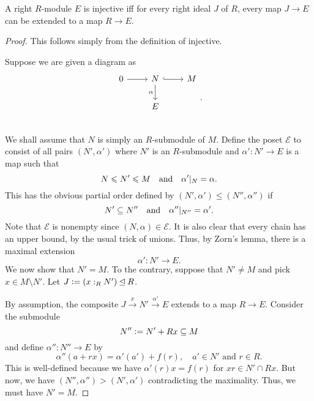 \begin{thm} \label{thm:baers-criterion}
	A right $R$-module $E$ is injective iff for every right ideal $J$ of $R$, every map $J \to E$ can be extended to a map $R \to E$.
\end{thm}
\begin{proof} 
	\forward This follows simply from the definition of injective.

	\backward Suppose we are given a diagram as
	\begin{equation*} 
		\begin{tikzcd}
			0 \arrow[r] & N \arrow[d, "\alpha"'] \arrow[r, hook] & M \\
			  & E & \\
		\end{tikzcd}.
	\end{equation*}
	We shall assume that $N$ is simply an $R$-submodule of $M$. Define the poset $\mathcal{E}$ to consist of all pairs $(N', \alpha')$ where $N'$ is an $R$-submodule and $\alpha' : N' \to E$ is a map such that
	\begin{equation*} 
		N \le N' \le M \andd \alpha'|_{N} = \alpha.
	\end{equation*}
	This has the obvious partial order defined by $(N', \alpha') \le (N'', \alpha'')$ if
	\begin{equation*} 
		N' \subset N'' \andd \alpha''|_{N''} = \alpha'.
	\end{equation*}
	Note that $\mathcal{E}$ is nonempty since $(N, \alpha) \in \mathcal{E}$. It is also clear that every chain has an upper bound, by the usual trick of unions. Thus, by Zorn's lemma, there is a maximal extension
	\begin{equation*} 
		\alpha' : N' \to E.
	\end{equation*}
	We now show that $N' = M$. To the contrary, suppose that $N' \neq M$ and pick $x \in M \setminus N'$. Let $J \vcentcolon= (x :_{R} N') \unlhd R$. 

	By assumption, the composite $J \xrightarrow{x} N' \xrightarrow{\alpha'} E$ extends to a map $R \to E$. Consider the submodule
	\begin{equation*} 
		N'' \vcentcolon= N' + Rx \subset M
	\end{equation*}
	and define $\alpha'' : N'' \to E$ by
	\begin{equation*} 
		\alpha''(a + rx) = \alpha'(a') + f(r), \quad a' \in N' \text{ and } r \in R.
	\end{equation*}
	This is well-defined because we have $\alpha'(r)x = f(r)$ for $xr \in N' \cap Rx$. But now, we have $(N'', \alpha'') > (N', \alpha')$ contradicting the maximality. Thus, we must have $N' = M$.
\end{proof}


